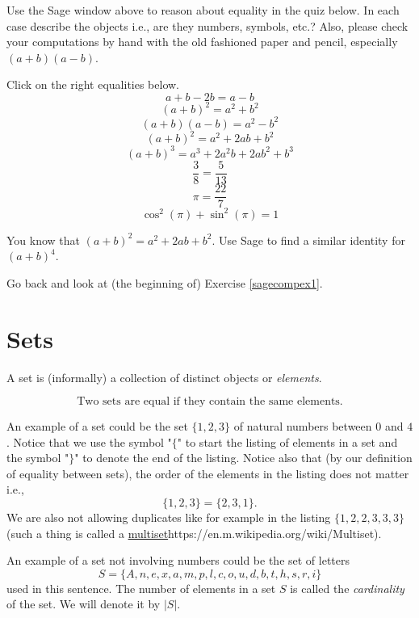 \documentclass{article}
\begin{document}
Use the Sage window above to reason 
about equality in the quiz below. In each case describe the objects i.e.,
are they numbers, symbols, etc.? Also, please check your computations
by hand with the old fashioned paper and pencil, especially $(a+b)(a-b)$.

\begin{quiz}
\question
Click on the right equalities below.
$$a + b - 2 b = a - b$$
$$(a+b)^2 = a^2 + b^2$$
$$(a + b)(a - b) = a^2 - b^2$$
$$(a + b)^2 = a^2 + 2 a b +  b^2$$
$$(a+b)^3 = a^3 + 2 a^2 b + 2 a b^2 + b^3$$
$$\frac{3}{8} = \frac{5}{13}$$ 
$$
\pi = \frac{22}{7}
$$
$$
\cos^2(\pi) + \sin^2(\pi) = 1
$$
\end{quiz}
\endshex

\beginshex
You know that $(a+ b)^2 = a^2 + 2 a b + b^2$. Use Sage to find a similar identity
for $(a + b)^4$.

\begin{hint}[showhide]
  Go back and look at (the beginning of) Exercise \ref{sagecompex1}.
\end{hint}
\endshex



\section{Sets}

A set is (informally) a collection of distinct objects or \emph{elements}. 

\begin{equation*}[emph]
  \text{Two sets are equal if they contain the same elements.}
\end{equation*}

An example of a set could be 
the set $\{1,2,3\}$ of natural numbers between $0$ and $4$. Notice that we use the symbol
"$\{$" to start the listing of elements in a set and the symbol "$\}$" to denote the end of the listing.
Notice also that (by our definition of equality between sets), the order of the elements in the listing does not matter i.e.,
$$
\{1, 2, 3\} = \{2, 3, 1\}.
$$
We are also not allowing duplicates like for
example in the listing $\{1, 2, 2, 3, 3, 3\}$ (such a thing is called a \url{multiset}{https://en.m.wikipedia.org/wiki/Multiset}).

An example of a set not involving numbers could be the set of letters 
$$
S=\{A, n, e, x, a, m, p, l, c, o, u, d, b, t, h, s, r, i\}
$$ 
used in this sentence. The number of elements in a set $S$ is called the \emph{cardinality} of the set.
We will denote it by $|S|$.
\end{document}
